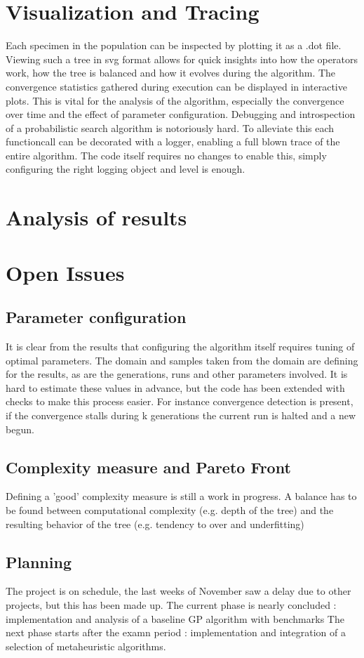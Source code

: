 \documentclass[10pt]{extarticle}
\begin{document}
\section{Visualization and Tracing}
Each specimen in the population can be inspected by plotting it as a .dot file. Viewing such a tree in svg format allows for quick insights into how the operators work, how the tree is balanced and how it evolves during the algorithm.
The convergence statistics gathered during execution can be displayed in interactive plots. This is vital for the analysis of the algorithm, especially the convergence over time and the effect of parameter configuration.
Debugging and introspection of a probabilistic search algorithm is notoriously hard. To alleviate this each functioncall can be decorated with a logger, enabling a full blown trace of the entire algorithm. The code itself requires no changes to enable this, simply configuring the right logging object and level is enough.
\section{Analysis of results}

\section{Open Issues}
\subsection{Parameter configuration}
It is clear from the results that configuring the algorithm itself requires tuning of optimal parameters. The domain and samples taken from the domain are defining for the results, as are the generations, runs and other parameters involved. It is hard to estimate these values in advance, but the code
has been extended with checks to make this process easier. For instance convergence detection is present, if the convergence stalls during k generations the current run is halted and a new begun.
\subsection{Complexity measure and Pareto Front}
Defining a 'good' complexity measure is still a work in progress. A balance has to be found between computational complexity (e.g. depth of the tree) and the resulting behavior of the tree (e.g. tendency to over and underfitting)
\subsection{Planning}
The project is on schedule, the last weeks of November saw a delay due to other projects, but this has been made up.
The current phase is nearly concluded : implementation and analysis of a baseline GP algorithm with benchmarks
The next phase starts after the examn period : implementation and integration of a selection of metaheuristic algorithms.
\end{document}
